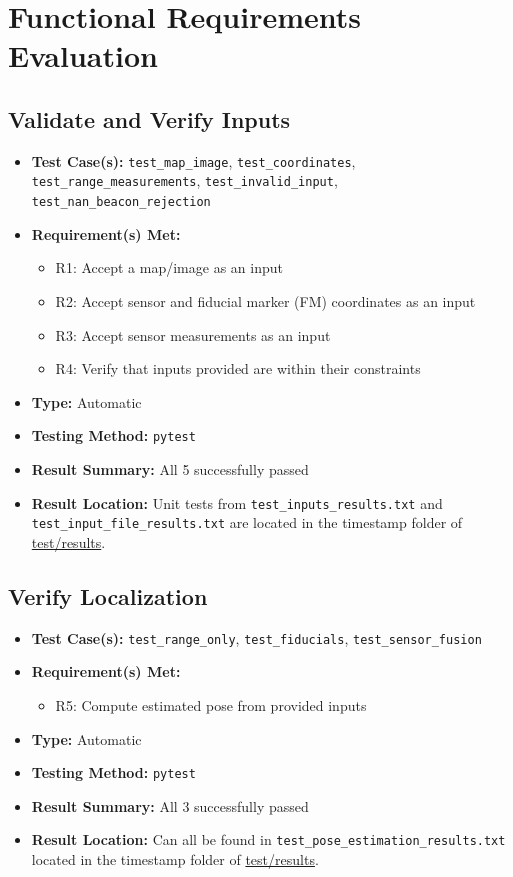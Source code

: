 \documentclass[12pt, titlepage]{article}
\begin{document}
\section{Functional Requirements Evaluation}

\subsection{Validate and Verify Inputs}
\begin{itemize}
  \item \textbf{Test Case(s): }\texttt{test\_map\_image}, \texttt{test\_coordinates}, \texttt{test\_range\_measurements}, \texttt{test\_invalid\_input}, \texttt{test\_nan\_beacon\_rejection}
  \item \textbf{Requirement(s) Met: }
  \begin{itemize}
    \item R1: Accept a map/image as an input
    \item R2: Accept sensor and fiducial marker (FM) coordinates as an input
    \item R3: Accept sensor measurements as an input
    \item R4: Verify that inputs provided are within their constraints
  \end{itemize}
  \item \textbf{Type: }Automatic
  \item \textbf{Testing Method: }\texttt{pytest}
  \item \textbf{Result Summary: }All 5 successfully passed
  \item \textbf{Result Location: }Unit tests from \texttt{test\_inputs\_results.txt} and \texttt{test\_input\_file\_results.txt} are located in the timestamp folder of \href{https://github.com/AliyahJimoh/2D-Localizer/tree/main/test/results/}{test/results}.
\end{itemize}


\subsection{Verify Localization}
\begin{itemize}
  \item \textbf{Test Case(s): }\texttt{test\_range\_only}, \texttt{test\_fiducials}, \texttt{test\_sensor\_fusion}
  \item \textbf{Requirement(s) Met: }
  \begin{itemize}
    \item R5: Compute estimated pose from provided inputs
  \end{itemize}
  \item \textbf{Type: }Automatic
  \item \textbf{Testing Method: }\texttt{pytest}
  \item \textbf{Result Summary: }All 3 successfully passed
  \item \textbf{Result Location: }Can all be found in \texttt{test\_pose\_estimation\_results.txt} located in the timestamp folder of \href{https://github.com/AliyahJimoh/2D-Localizer/tree/main/test/results/}{test/results}.
\end{itemize}
\end{document}
